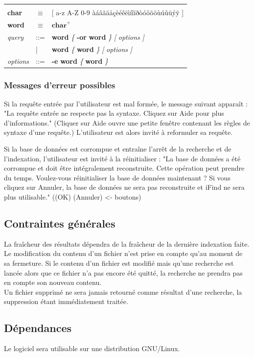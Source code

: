 \documentclass[a4paper,10pt]{article}
\begin{document}
\begin{tabular}{p{1.5cm} p{0.5cm} p{9cm} }
& & \\
\textbf{char} & $\equiv$ & [ a-z A-Z 0-9 àáâãäåçèéêëìíîïðòóôõöùúûüýÿ ]\\
\textbf{word} & $\equiv$ & $\textbf{char}^+$\\
\textit{query} & ::= & \textbf{word} \textit{\{} \textbf{-or} \textbf{word} \textit{\}} \textit{[} \textit{options} \textit{]}\\
& | & \textbf{word} \textit{\{} \textbf{word} \textit{\}} \textit{[} \textit{options} \textit{]}\\
\textit{options} & ::= & \textbf{-e} \textbf{word} \textit{\{} \textbf{word} \textit{\}}\\
\end{tabular}



\subsubsection{Messages d'erreur possibles}
Si la requête entrée par l'utilisateur est mal formée, le message suivant apparaît :
"La requête entrée ne respecte pas la syntaxe. Cliquez sur Aide pour plus d'informations."
(Cliquer sur Aide ouvre une petite fenêtre contenant les règles de syntaxe d'une requête.)
L'utilisateur est alors invité à reformuler sa requête.

Si la base de données est corrompue et entraîne l'arrêt de la recherche et de l'indexation, l'utilisateur est invité à la réinitialiser :
"La base de données a été corrompue et doit être intégralement reconstruite. 
Cette opération peut prendre du temps. Voulez-vous réinitialiser la base de données maintenant ?
Si vous cliquez sur Annuler, la base de données ne sera pas reconstruite et iFind ne sera plus utilisable."
((OK) (Annuler) <- boutons)

\subsection{Contraintes générales}
La fraîcheur des résultats dépendra de la fraîcheur de la dernière indexation faite.\\
Le modification du contenu d'un fichier n'est prise en compte qu'au moment de sa
fermeture. Si le contenu d'un fichier est modifié mais qu'une recherche est
lancée alors que ce fichier n'a pas encore été quitté, la recherche ne prendra
pas en compte son nouveau contenu.\\
Un fichier supprimé ne sera jamais retourné comme résultat d'une recherche, la
suppression étant immédiatement traitée.


\subsection{Dépendances}
Le logiciel sera utilisable sur une distribution GNU/Linux.

\newpage
\end{document}
